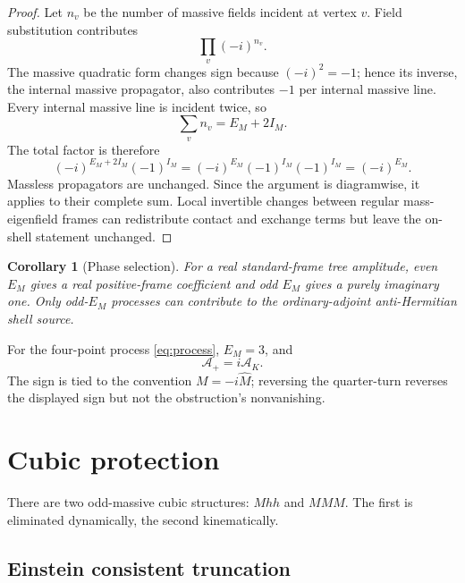 \documentclass[11pt]{article}
\newtheorem{corollary}[theorem]{Corollary}
\theoremstyle{definition}
\theoremstyle{remark}
\begin{document}
\begin{proof}
Let $n_v$ be the number of massive fields incident at vertex $v$.  Field
substitution contributes
\begin{equation}
\prod_v(-i)^{n_v}.
\end{equation}
The massive quadratic form changes sign because
$(-i)^2=-1$; hence its inverse, the internal massive propagator, also
contributes $-1$ per internal massive line.  Every internal massive line
is incident twice, so
\begin{equation}
\sum_v n_v=E_M+2I_M.
\end{equation}
The total factor is therefore
\begin{equation}
(-i)^{E_M+2I_M}(-1)^{I_M}
=(-i)^{E_M}(-1)^{I_M}(-1)^{I_M}
=(-i)^{E_M}.
\end{equation}
Massless propagators are unchanged.  Since the argument is diagramwise,
it applies to their complete sum.  Local invertible changes between
regular mass-eigenfield frames can redistribute contact and exchange
terms but leave the on-shell statement unchanged.
\end{proof}

\begin{corollary}[Phase selection]\label{cor:phase}
For a real standard-frame tree amplitude, even $E_M$ gives a real
positive-frame coefficient and odd $E_M$ gives a purely imaginary one.
Only odd-$E_M$ processes can contribute to the ordinary-adjoint
anti-Hermitian shell source.
\end{corollary}

For the four-point process \eqref{eq:process}, $E_M=3$, and
\begin{equation}\label{eq:mmmhphase}
\mathcal A_+=i\mathcal A_K.
\end{equation}
The sign is tied to the convention $M=-i\widehat M$; reversing the
quarter-turn reverses the displayed sign but not the obstruction's
nonvanishing.

\section{Cubic protection}\label{sec:cubic}

There are two odd-massive cubic structures: $Mhh$ and $MMM$.  The first
is eliminated dynamically, the second kinematically.

\subsection{Einstein consistent truncation}
\end{document}
